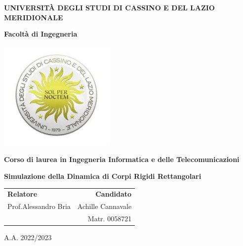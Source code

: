 \documentclass[titlepage, oneside, 12pt]{book}
\begin{document}
\begin{titlepage}
    \centering
    
    
     
        {\large\bfseries
    UNIVERSITÀ DEGLI STUDI DI CASSINO
    E DEL LAZIO MERIDIONALE
    \par
    }
    \vspace{6ex}
    {\LARGE
    \textbf{Facoltà di Ingegneria}
    \par}
    \vspace{1cm}
    \includegraphics{Images/logo_unicas.png}
    \vspace{1cm}

\textbf{\large Corso di laurea in Ingegneria Informatica e delle Telecomunicazioni}

\vspace{1cm}
       
{\Huge
\textbf{Simulazione della Dinamica di Corpi Rigidi Rettangolari}
\par}
\vfill
{\LARGE
\begin{table}[h!]
    \centering
    
    \begin{tabularx}{\textwidth}{|X r|}
        \textbf{Relatore} & \textbf{Candidato} \\
        Prof.Alessandro Bria & Achille Cannavale\\
         & Matr. 0058721
    \end{tabularx}
\end{table}
\large
A.A. 2022/2023
\par}

\end{titlepage}
\tableofcontents


\end{document}
